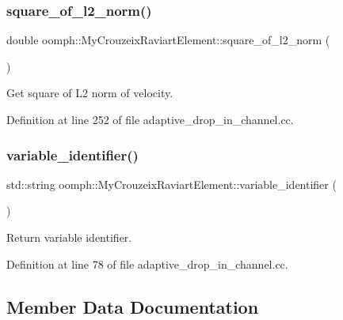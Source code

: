 \subsubsection{\texorpdfstring{square\+\_\+of\+\_\+l2\+\_\+norm()}{square\_of\_l2\_norm()}}
{\footnotesize\ttfamily double oomph\+::\+My\+Crouzeix\+Raviart\+Element\+::square\+\_\+of\+\_\+l2\+\_\+norm (\begin{DoxyParamCaption}{ }\end{DoxyParamCaption})\hspace{0.3cm}{\ttfamily [inline]}}



Get square of L2 norm of velocity. 



Definition at line 252 of file adaptive\+\_\+drop\+\_\+in\+\_\+channel.\+cc.

\mbox{\label{classoomph_1_1MyCrouzeixRaviartElement_afbec727a48f104b945cc54f798cbd1d3}} 
\subsubsection{\texorpdfstring{variable\+\_\+identifier()}{variable\_identifier()}}
{\footnotesize\ttfamily std\+::string oomph\+::\+My\+Crouzeix\+Raviart\+Element\+::variable\+\_\+identifier (\begin{DoxyParamCaption}{ }\end{DoxyParamCaption})\hspace{0.3cm}{\ttfamily [inline]}}



Return variable identifier. 



Definition at line 78 of file adaptive\+\_\+drop\+\_\+in\+\_\+channel.\+cc.



\subsection{Member Data Documentation}
\mbox{\label{classoomph_1_1MyCrouzeixRaviartElement_aac525f961951f5d621f141b4fcdda357}} 
